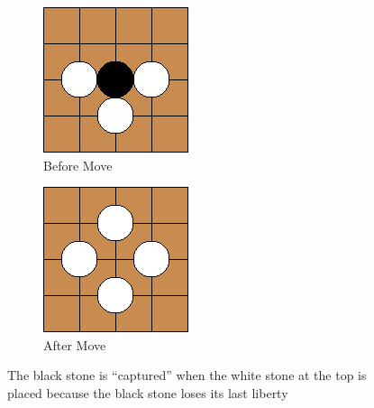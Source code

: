 \documentclass{l4proj}
\begin{document}
\begin{figure}[!ht]
\centering
\begin{subfigure}[b]{0.20\textwidth}
\includegraphics[width=\textwidth]{ex/Ex1-0.png}
\caption{Before Move}
\label{fig:ex1-0}
\end{subfigure} \qquad\qquad\qquad
\begin{subfigure}[b]{0.20\textwidth}
\includegraphics[width=\textwidth]{ex/Ex1-1.png}
\caption{After Move}
\label{fig:ex1-1}
\end{subfigure}
\caption{The black stone is “captured” when the white stone at the top is placed because the black stone loses its last liberty}
\label{fig:ex1}
\end{figure}
\end{document}
